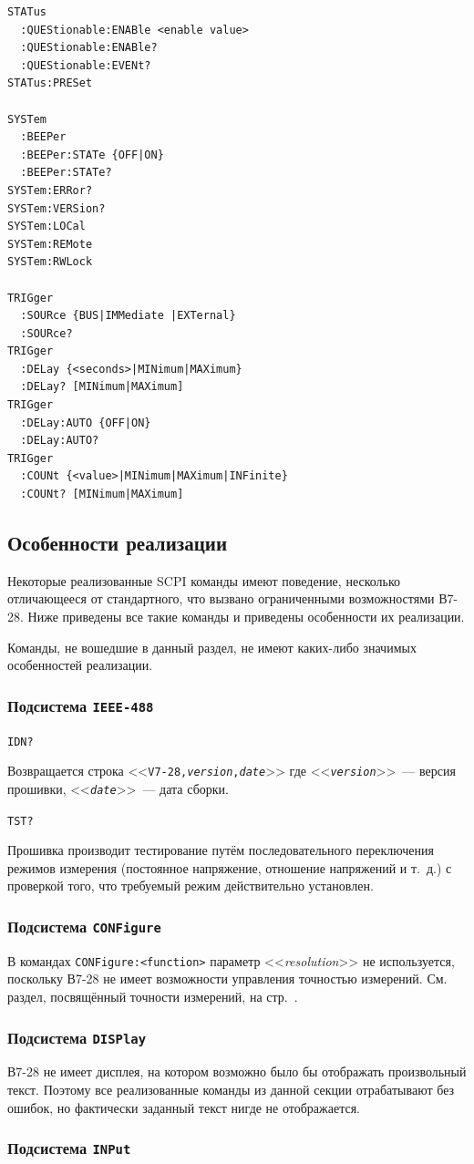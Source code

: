 \documentclass[12pt, a4paper]{article}
\newcommand{\V}{\mbox{В7-28}}
\newcommand{\CMD}[1]{{\tt #1}}
\newcommand{\PARAM}[1]{<<{\it #1}>>}
\newcommand{\RESPONSE}[1]{<<{\tt #1}>>}
\newcommand{\SUBSYSTEMSECTION}[1]{\subsubsection{Подсистема \CMD{#1}}}
\newcommand{\CMDSECTION}[1]{\CMD{#1}  }
\begin{document}
\begin{verbatim}
STATus
  :QUEStionable:ENABle <enable value>
  :QUEStionable:ENABle?
  :QUEStionable:EVENt?
STATus:PRESet

SYSTem
  :BEEPer
  :BEEPer:STATe {OFF|ON}
  :BEEPer:STATe?
SYSTem:ERRor?
SYSTem:VERSion?
SYSTem:LOCal
SYSTem:REMote
SYSTem:RWLock

TRIGger
  :SOURce {BUS|IMMediate |EXTernal}
  :SOURce?
TRIGger
  :DELay {<seconds>|MINimum|MAXimum}
  :DELay? [MINimum|MAXimum]
TRIGger
  :DELay:AUTO {OFF|ON}
  :DELay:AUTO?
TRIGger
  :COUNt {<value>|MINimum|MAXimum|INFinite}
  :COUNt? [MINimum|MAXimum]
\end{verbatim}

\subsection{Особенности реализации}

Некоторые реализованные SCPI команды имеют поведение, несколько отличающееся от стандартного, что вызвано ограниченными возможностями \V{}. Ниже приведены все такие команды и приведены особенности их реализации.

Команды, не вошедшие в данный раздел, не имеют каких-либо значимых особенностей реализации.

\SUBSYSTEMSECTION{IEEE-488}

\CMDSECTION{*IDN?}

Возвращается строка \RESPONSE{V7-28,{\it version},{\it date}} где \RESPONSE{{\it version}}~--- версия прошивки, \RESPONSE{{\it date}}~--- дата сборки.

\CMDSECTION{*TST?}

Прошивка производит тестирование путём последовательного переключения режимов измерения (постоянное напряжение, отношение напряжений и т.~д.) с проверкой того, что требуемый режим действительно установлен.

\SUBSYSTEMSECTION{CONFigure}

В командах \CMD{CONFigure:<function>} параметр \PARAM{resolution} не используется, поскольку \V{} не имеет возможности управления точностью измерений. См. раздел, посвящённый точности измерений, на стр.~\pageref{sec_precision}.

\SUBSYSTEMSECTION{DISPlay}

\V{} не имеет дисплея, на котором возможно было бы отображать произвольный текст. Поэтому все реализованные команды из данной секции отрабатывают без ошибок, но фактически заданный текст нигде не отображается.

\SUBSYSTEMSECTION{INPut}
\end{document}
